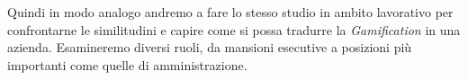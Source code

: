 Quindi in modo analogo andremo a fare lo stesso studio in ambito lavorativo per confrontarne le similitudini e capire come si possa tradurre la \textit{Gamification} in una azienda. Esamineremo diversi ruoli, da mansioni esecutive a posizioni più importanti come quelle di amministrazione.
\\
\\
\\
\\
\\
\\
\\
\\
\\
\\

